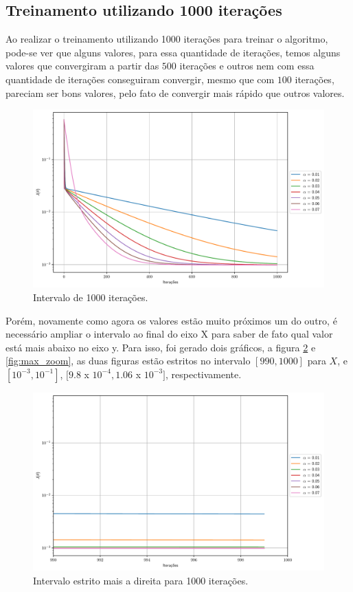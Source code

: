 \documentclass[a4paper, 12pt]{article}
\begin{document}
\subsection{Treinamento utilizando 1000 iterações}

Ao realizar o treinamento utilizando 1000 iterações para treinar o algoritmo, pode-se ver que alguns valores, para
essa quantidade de iterações, temos alguns valores que convergiram a partir das $500$ iterações e outros nem com 
essa quantidade de iterações conseguiram convergir, mesmo que com $100$ iterações, pareciam ser bons valores, pelo
fato de convergir mais rápido que outros valores.
\begin{figure}[!h]
    \centering
    \includegraphics[width=1\textwidth]{../imgs/lr_1000it.pdf}
    \caption{Intervalo de 1000 iterações.}
    \label{fig:lr_100it}
\end{figure}

Porém, novamente como agora os valores estão muito próximos um do outro, é necessário ampliar o intervalo
ao final do eixo X para saber de fato qual valor está mais abaixo no eixo y. Para isso, foi gerado dois gráficos,
a figura \ref{fig:higher_interval_1000it} e \ref{fig:max_zoom}, as duas figuras estão estritos no intervalo $[990,1000]$ para $X$, e 
$[10^{-3},10^{-1}]$, $[9.8$ x $10^{-4},1.06$ x $10^{-3}]$, respectivamente.

\clearpage

\begin{figure}[!h]
    \centering
    \includegraphics[width=1\textwidth]{../imgs/higher_interval_1000it.pdf}
    \caption{Intervalo estrito mais a direita para 1000 iterações.}
    \label{fig:higher_interval_1000it}
\end{figure}
\end{document}
